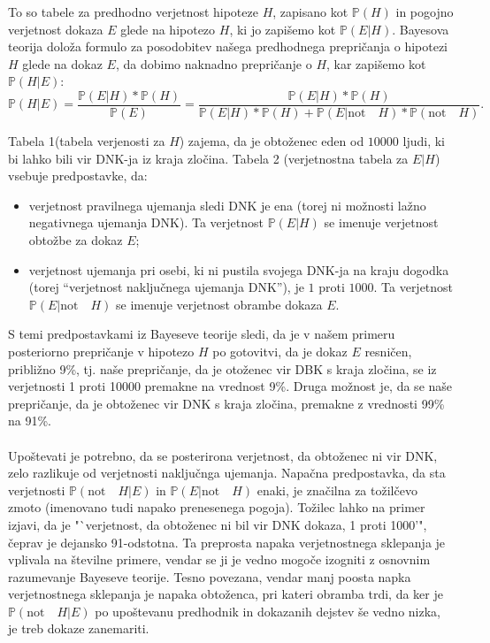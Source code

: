\documentclass[a4paper,12pt]{article}
\begin{document}
To so tabele za predhodno verjetnost hipoteze $H$, zapisano kot $\mathbb{P}(H)$ in pogojno verjetnost dokaza $E$ glede na hipotezo $H$, ki 
jo zapišemo kot $\mathbb{P}(E \lvert H)$. Bayesova teorija doloža formulo za posodobitev našega predhodnega prepričanja o hipotezi $H$ glede na 
dokaz $E$, da dobimo naknadno prepričanje o $H$, kar zapišemo kot $\mathbb{P}(H \lvert E)$:
\[\mathbb{P}(H \lvert E) = \frac{\mathbb{P}(E \lvert H)*\mathbb{P}(H)}{\mathbb{P}(E)} = \frac{\mathbb{P}(E \lvert H)*\mathbb{P}(H)}{\mathbb{P}(E \lvert H)*\mathbb{P}(H) + \mathbb{P}(E \lvert \text{not}\quad H)*\mathbb{P}(\text{not}\quad H)}.\]

Tabela 1(tabela verjenosti za $H$) zajema, da je obtoženec eden od $10000$ ljudi, ki bi lahko bili vir DNK-ja iz kraja zločina. Tabela 2 
(verjetnostna tabela za $E \lvert H$) vsebuje predpostavke, da: 
\begin{itemize}
    \item verjetnost pravilnega ujemanja sledi DNK je ena (torej ni možnosti lažno negativnega ujemanja DNK). Ta verjetnost $\mathbb{P}(E \lvert H)$ 
          se imenuje verjetnost obtožbe za dokaz $E$;
    \item verjetnost ujemanja pri osebi, ki ni pustila svojega DNK-ja na kraju dogodka (torej "`verjetnost naključnega ujemanja DNK"'), je $1$ 
          proti $1000$. Ta verjetnost $\mathbb{P}(E \lvert \text{not}\quad H)$ se imenuje verjetnost obrambe dokaza $E$.
\end{itemize}

S temi predpostavkami iz Bayeseve teorije sledi, da je v našem primeru posteriorno prepričanje v hipotezo $H$ po gotovitvi, da je dokaz $E$ 
resničen, približno 9\%, tj. naše prepričanje, da je otoženec vir DBK s kraja zločina, se iz verjetnosti 1 proti 10000 premakne na vrednost 9\%. 
Druga možnost je, da se naše prepričanje, da je obtoženec vir DNK s kraja zločina, premakne z vrednosti 99\% na 91\%. \\ \\

Upoštevati je potrebno, da se posterirona verjetnost, da obtoženec ni vir DNK, zelo razlikuje od verjetnosti naključnga ujemanja. Napačna 
predpostavka, da sta verjetnosti $\mathbb{P}(\text{not}\quad H \lvert E)$ in $\mathbb{P}(E \lvert \text{not}\quad H)$ enaki, je značilna za 
tožilčevo zmoto (imenovano tudi napako prenesenega pogoja). Tožilec lahko na primer izjavi, da je "`verjetnost, da obtoženec ni bil vir DNK 
dokaza, 1 proti 1000'", čeprav je dejansko 91-odstotna. Ta preprosta napaka verjetnostnega sklepanja je vplivala na številne primere, vendar 
se ji je vedno mogoče izogniti z osnovnim razumevanje Bayeseve teorije. Tesno povezana, vendar manj poosta napka verjetnostnega sklepanja je 
napaka obtoženca, pri kateri obramba trdi, da ker je $\mathbb{P}(\text{not}\quad H \lvert E)$ po upoštevanu predhodnik in dokazanih dejstev 
še vedno nizka, je treb dokaze zanemariti. \\ \\
\end{document}
